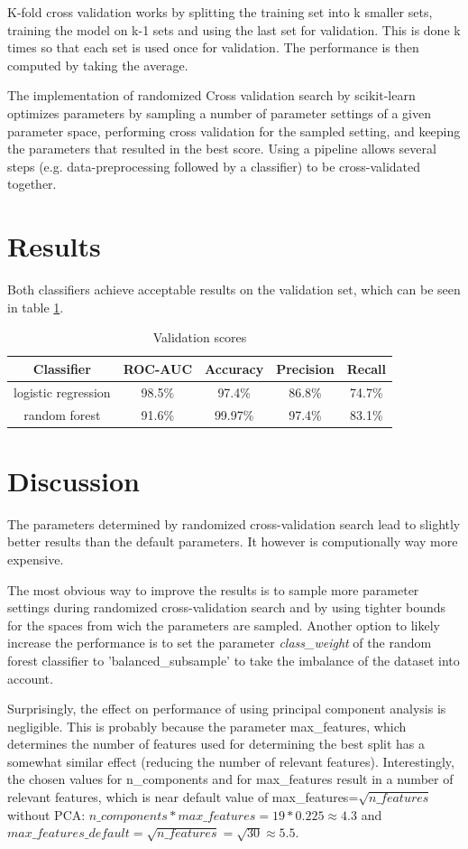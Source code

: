 \documentclass[a4, 10 pt, conference]{ieeeconf}  %
\begin{document}
K-fold cross validation works by splitting the training set into k smaller sets, training the model on k-1 sets and using the last set for validation. This is done k times so that each set is used once for validation. The performance is then computed by taking the average. \cite{sl.cv}

The implementation of randomized Cross validation search by scikit-learn optimizes parameters by sampling a number of parameter settings of a given parameter space, performing cross validation for the sampled setting, and keeping the parameters that resulted in the best score. Using a pipeline allows several steps (e.g. data-preprocessing followed by a classifier) to be cross-validated together. \cite{sl.rcv}

\section{Results}
\label{sec:results}
Both classifiers achieve acceptable results on the validation set, which can be seen in table \ref{tab:results}.

\begin{table}[h]
\centering
\begin{tabular}{c|c|c|c|c}
Classifier & ROC-AUC & Accuracy & Precision & Recall\\
\hline logistic regression & 98.5\% &  97.4\% & 86.8\% & 74.7\% \\
\hline random forest & 91.6\% & 99.97\% & 97.4\% & 83.1\%
\end{tabular}
\caption{Validation scores}
\label{tab:results}
\end{table}

\section{Discussion}
\label{sec:discuss}
The parameters determined by randomized cross-validation search lead to slightly better results than the default parameters. It however is computionally way more expensive.

The most obvious way to improve the results is to sample more parameter settings during randomized cross-validation search and by using tighter bounds for the spaces from wich the parameters are sampled. Another option to likely increase the performance is to set the parameter \emph{class\_weight} of the random forest classifier to 'balanced\_subsample' to take the imbalance of the dataset into account.

Surprisingly, the effect on performance of using principal component analysis is negligible. This is probably because the parameter max\_features, which determines the number of features used for determining the best split has a somewhat similar effect (reducing the number of relevant features). Interestingly, the chosen values for n\_components and for max\_features result in a number of relevant features, which is near default value of max\_features=$\sqrt{n\_features}$ \cite{sl.rf} without PCA: $n\_components*max\_features = 19*0.225 \approx 4.3$ and $max\_features\_default=\sqrt{n\_features}=\sqrt{30}\approx 5.5$.
\end{document}

